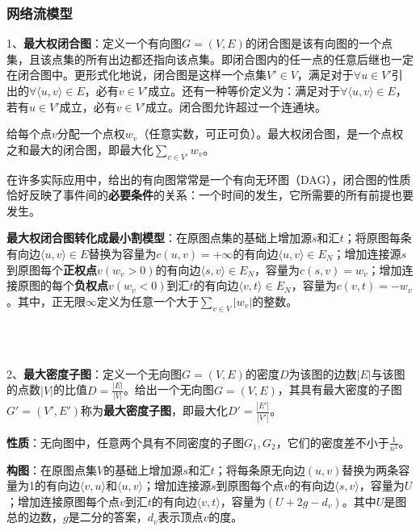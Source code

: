\subsubsection{网络流模型}
1、\textbf{最大权闭合图}：定义一个有向图$G=(V,E)$的闭合图是该有向图的一个点集，且该点集的所有出边都还指向该点集。即闭合图内的任一点的任意后继也一定在闭合图中。更形式化地说，闭合图是这样一个点集$V' \in V$，满足对于$\forall u \in V'$引出的$\forall \langle u,v \rangle \in E$，必有$v \in V'$成立。还有一种等价定义为：满足对于$\forall \langle u,v \rangle \in E$，若有$u \in V'$成立，必有$v \in V'$成立。闭合图允许超过一个连通块。\par
给每个点$v$分配一个点权$w_v$（任意实数，可正可负）。最大权闭合图，是一个点权之和最大的闭合图，即最大化$\sum_{v \in V'}w_v$。\par
在许多实际应用中，给出的有向图常常是一个有向无环图（DAG），闭合图的性质恰好反映了事件间的\textbf{必要条件}的关系：一个时间的发生，它所需要的所有前提也要发生。\par
\textbf{最大权闭合图转化成最小割模型}：在原图点集的基础上增加源$s$和汇$t$；将原图每条有向边$\langle u,v \rangle \in E$替换为容量为$c(u,v)=+\infty$的有向边$\langle u,v \rangle \in E_N$；增加连接源$s$到原图每个\textbf{正权点}$v(w_v>0)$的有向边$\langle s,v \rangle \in E_N$，容量为$c(s,v)=w_v$；增加连接原图的每个\textbf{负权点}$v(w_v<0)$到汇$t$的有向边$\langle v,t \rangle \in E_N$，容量为$c(v,t)=-w_v$。其中，正无限$\infty$定义为任意一个大于$\sum_{v\in V}|w_v|$的整数。

~\\
~\\ \par
2、\textbf{最大密度子图}：定义一个无向图$G=(V,E)$的密度$D$为该图的边数$|E|$与该图的点数$|V|$的比值$D=\frac{|E|}{|V|}$。给出一个无向图$G=(V,E)$，其具有最大密度的子图$G'=(V',E')$称为\textbf{最大密度子图}，即最大化$D'=\frac{|E'|}{|V'|}$。\par
\textbf{性质}：无向图中，任意两个具有不同密度的子图$G_1,G_2$，它们的密度差不小于$\frac{1}{n^2}$。\par
\textbf{构图}：在原图点集$V$的基础上增加源$s$和汇$t$；将每条原无向边$(u,v)$替换为两条容量为1的有向边$\langle v,u \rangle$和$\langle u,v \rangle$；增加连接源$s$到原图每个点$v$的有向边$\langle s,v \rangle$，容量为$U$；增加连接原图每个点$v$到汇$t$的有向边$\langle v,t \rangle$，容量为$(U+2g-d_v)$。其中$U$是图总的边数，$g$是二分的答案，$d_v$表示顶点$v$的度。













